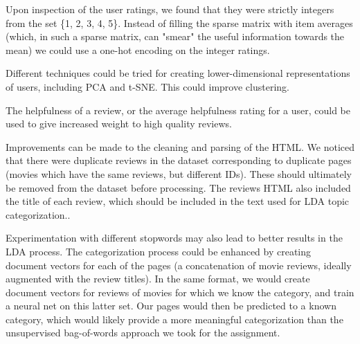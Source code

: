 \documentclass[11pt]{article}
\begin{document}
Upon inspection of the user ratings, we found that they were strictly integers from the set \{1, 2, 3, 4, 5\}. Instead of filling the sparse matrix with item averages (which, in such a sparse matrix, can "smear" the useful information towards the mean) we could use a one-hot encoding on the integer ratings.\newline

Different techniques could be tried for creating lower-dimensional representations of users, including PCA and t-SNE. This could improve clustering.\newline

The helpfulness of a review, or the average helpfulness rating for a user, could be used to give increased weight to high quality reviews.\newline

Improvements can be made to the cleaning and parsing of the HTML. We noticed that there were duplicate reviews in the dataset corresponding to duplicate pages (movies which have the same reviews, but different IDs). These should ultimately be removed from the dataset before processing. The reviews HTML also included the title of each review, which should be included in the text used for LDA topic categorization.\newline.

Experimentation with different stopwords may also lead to better results in the LDA process. The categorization process could be enhanced by creating document vectors for each of the pages (a concatenation of movie reviews, ideally augmented with the review titles). In the same format, we would create document vectors for reviews of movies for which we know the category, and train a neural net on this latter set. Our pages would then be predicted to a known category, which would likely provide a more meaningful categorization than the unsupervised bag-of-words approach we took for the assignment.
\end{document}
